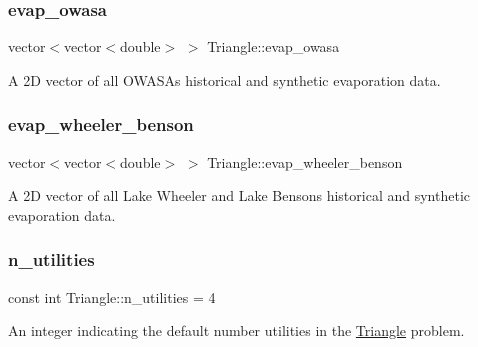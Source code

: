 \subsubsection{\texorpdfstring{evap\+\_\+owasa}{evap\_owasa}}
{\footnotesize\ttfamily vector$<$vector$<$double$>$ $>$ Triangle\+::evap\+\_\+owasa\hspace{0.3cm}{\ttfamily [private]}}



A 2D vector of all O\+W\+A\+SA\textquotesingle{}s historical and synthetic evaporation data. 

\mbox{\label{classTriangle_a03a6df04c98f4a9030de3da381155cd8}} 
\subsubsection{\texorpdfstring{evap\+\_\+wheeler\+\_\+benson}{evap\_wheeler\_benson}}
{\footnotesize\ttfamily vector$<$vector$<$double$>$ $>$ Triangle\+::evap\+\_\+wheeler\+\_\+benson\hspace{0.3cm}{\ttfamily [private]}}



A 2D vector of all Lake Wheeler and Lake Benson\textquotesingle{}s historical and synthetic evaporation data. 

\mbox{\label{classTriangle_a27fd697e6e14227b71a617ddbcec9653}} 
\subsubsection{\texorpdfstring{n\+\_\+utilities}{n\_utilities}}
{\footnotesize\ttfamily const int Triangle\+::n\+\_\+utilities = 4\hspace{0.3cm}{\ttfamily [private]}}



An integer indicating the default number utilities in the \mbox{\hyperlink{classTriangle}{Triangle}} problem. 

\mbox{\label{classTriangle_af2243c78316c4f0afc1535d35aef182c}} 
